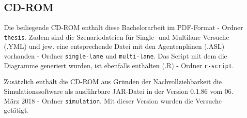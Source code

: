 \newpage

\subsection*{CD-ROM}

Die beiliegende CD-ROM enthält diese Bachelorarbeit im PDF-Format - Ordner \texttt{thesis}.
Zudem sind die Szenariodateien für Single- und Multilane-Versuche (.YML) und jew. eine entsprechende Datei mit den Agentenplänen (.ASL) vorhanden - Ordner \texttt{single-lane} und \texttt{multi-lane}.
Das Script mit dem die Diagramme generiert wurden, ist ebenfalls enthalten (.R) - Ordner \texttt{r-script}.

Zusätzlich enthält die CD-ROM aus Gründen der Nachvollziehbarkeit die Simulationssoftware als ausführbare JAR-Datei in der Version 0.1.86 vom 06. März 2018 - Ordner \texttt{simulation}.
Mit dieser Version wurden die Versuche getätigt.

